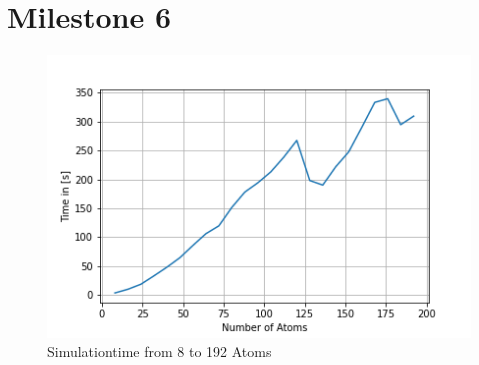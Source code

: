 \chapter{Milestone 6}

\begin{figure}[!h]
	\begin{center}
		\includegraphics[scale=1]{Figure/plotAtomTimesTree.png}
	\end{center}
	\caption[Simulationtime with a Cutoff]{Simulationtime from 8 to 192 Atoms }
	\label{PlotAtomTimesCutoff}
\end{figure}
